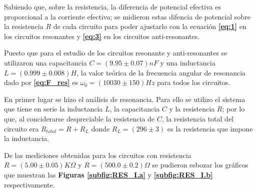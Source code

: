 \documentclass[11pt,a4paper]{article}
\begin{document}
Sabiendo que, sobre la resistencia, la diferencia de potencial efectiva es proporcional a la corriente efectiva; se midieron estas difencia de potencial sobre la resistencia $R$ de cada circuito para poder ajustarlo con la ecuación \textbf{\eqref{eq:1}} en los circuitos resonantes y \textbf{\eqref{eq:3}} en los circuitos anti-resonantes.  

Puesto que para el estudio de los circuitos resonante y anti-resonantes se utilizaron una capacitancia $C= (9.95 \pm 0.07)nF$ y una inductancia $L= (0.999 \pm 0.008) H$, la valor teórica de la frecuencia angular de resonancia dado por \textbf{\eqref{eq:F_res}} es $\omega_{0}=(10030 \pm 150) Hz$ para todos los circuitos.

En primer lugar se hizo el análisis de resonancia. Para ello se utilizo el sistema que tiene en serie la inductancia $L$, la capacitancia $C$ y la resistencia $R$; por lo que, al conciderarse despreciable la resistencia de $C$, la resistencia total del circuito era $R_{total} = R+R_{L}$ donde $R_{L} = (296 \pm 3)$ es la resistencia que impone la inductancia.

De las mediciones obtenidas para los circuitos con resistencia $R=(5.00 \pm 0.05)K\Omega$ y $R=(500.0 \pm 0.2)\Omega$ se pudieron esbozar los gráficos que muestran las \textbf{Figuras \ref{subfig:RES_I.a}} y \textbf{\ref{subfig:RES_I.b}} respectivamente.
\end{document}
